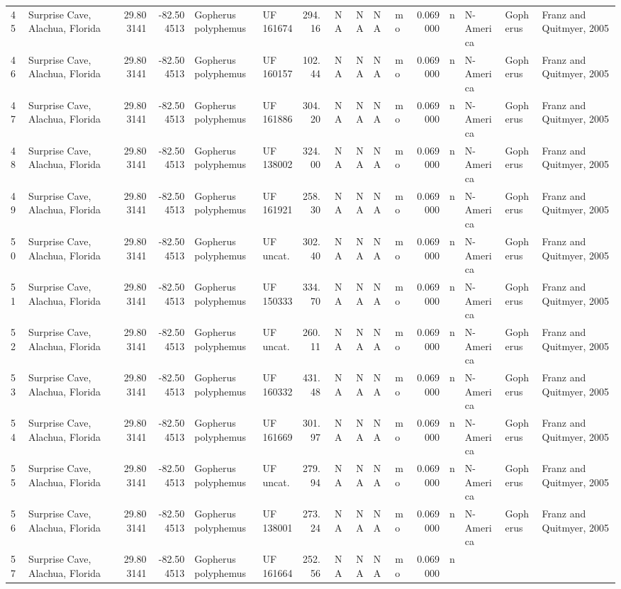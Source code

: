 \documentclass[]{article}
\begin{document}
\begin{longtable}[]{@{}llrrllrrrllrllll@{}}
45 & Surprise Cave, Alachua, Florida & 29.803141 & -82.504513 & Gopherus
polyphemus & UF 161674 & 294.16 & NA & NA & NA & mo & 0.069000 & n &
N-America & Gopherus & Franz and Quitmyer, 2005\tabularnewline
46 & Surprise Cave, Alachua, Florida & 29.803141 & -82.504513 & Gopherus
polyphemus & UF 160157 & 102.44 & NA & NA & NA & mo & 0.069000 & n &
N-America & Gopherus & Franz and Quitmyer, 2005\tabularnewline
47 & Surprise Cave, Alachua, Florida & 29.803141 & -82.504513 & Gopherus
polyphemus & UF 161886 & 304.20 & NA & NA & NA & mo & 0.069000 & n &
N-America & Gopherus & Franz and Quitmyer, 2005\tabularnewline
48 & Surprise Cave, Alachua, Florida & 29.803141 & -82.504513 & Gopherus
polyphemus & UF 138002 & 324.00 & NA & NA & NA & mo & 0.069000 & n &
N-America & Gopherus & Franz and Quitmyer, 2005\tabularnewline
49 & Surprise Cave, Alachua, Florida & 29.803141 & -82.504513 & Gopherus
polyphemus & UF 161921 & 258.30 & NA & NA & NA & mo & 0.069000 & n &
N-America & Gopherus & Franz and Quitmyer, 2005\tabularnewline
50 & Surprise Cave, Alachua, Florida & 29.803141 & -82.504513 & Gopherus
polyphemus & UF uncat. & 302.40 & NA & NA & NA & mo & 0.069000 & n &
N-America & Gopherus & Franz and Quitmyer, 2005\tabularnewline
51 & Surprise Cave, Alachua, Florida & 29.803141 & -82.504513 & Gopherus
polyphemus & UF 150333 & 334.70 & NA & NA & NA & mo & 0.069000 & n &
N-America & Gopherus & Franz and Quitmyer, 2005\tabularnewline
52 & Surprise Cave, Alachua, Florida & 29.803141 & -82.504513 & Gopherus
polyphemus & UF uncat. & 260.11 & NA & NA & NA & mo & 0.069000 & n &
N-America & Gopherus & Franz and Quitmyer, 2005\tabularnewline
53 & Surprise Cave, Alachua, Florida & 29.803141 & -82.504513 & Gopherus
polyphemus & UF 160332 & 431.48 & NA & NA & NA & mo & 0.069000 & n &
N-America & Gopherus & Franz and Quitmyer, 2005\tabularnewline
54 & Surprise Cave, Alachua, Florida & 29.803141 & -82.504513 & Gopherus
polyphemus & UF 161669 & 301.97 & NA & NA & NA & mo & 0.069000 & n &
N-America & Gopherus & Franz and Quitmyer, 2005\tabularnewline
55 & Surprise Cave, Alachua, Florida & 29.803141 & -82.504513 & Gopherus
polyphemus & UF uncat. & 279.94 & NA & NA & NA & mo & 0.069000 & n &
N-America & Gopherus & Franz and Quitmyer, 2005\tabularnewline
56 & Surprise Cave, Alachua, Florida & 29.803141 & -82.504513 & Gopherus
polyphemus & UF 138001 & 273.24 & NA & NA & NA & mo & 0.069000 & n &
N-America & Gopherus & Franz and Quitmyer, 2005\tabularnewline
57 & Surprise Cave, Alachua, Florida & 29.803141 & -82.504513 & Gopherus
polyphemus & UF 161664 & 252.56 & NA & NA & NA & mo & 0.069000 & n &

\end{longtable}
\end{document}
